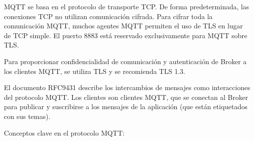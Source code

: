 MQTT se basa en el protocolo de transporte TCP. De forma predeterminada, las conexiones TCP no utilizan comunicación cifrada. Para cifrar toda la comunicación MQTT, muchos agentes MQTT permiten el uso de TLS en lugar de TCP simple. El puerto 8883 está reservado exclusivamente para MQTT sobre TLS.\cite{hivemq-mqtt-security_tls_ssl}

Para proporcionar confidencialidad de comunicación y autenticación de Broker a los clientes MQTT, se utiliza TLS y se recomienda TLS 1.3\cite{rfc8446}.

El documento RFC9431\cite{rfc9431} describe los intercambios de mensajes como interacciones del protocolo MQTT. Los clientes son clientes MQTT, que se conectan al Broker para publicar y suscribirse a los mensajes de la aplicación (que están etiquetados con sus temas).

Conceptos clave en el protocolo MQTT:

